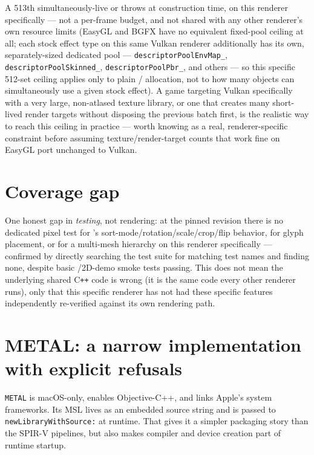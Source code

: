 A 513th simultaneously-live  or  throws at
construction time, on this renderer specifically --- not a per-frame budget, and not shared with
any other renderer's own resource limits (EasyGL and BGFX have no equivalent fixed-pool
ceiling at all; each stock effect type on this same Vulkan renderer additionally has its own,
separately-sized dedicated pool --- \texttt{descriptorPoolEnvMap\_},
\texttt{descriptorPoolSkinned\_}, \texttt{descriptorPoolPbr\_}, and others --- so this specific
512-set ceiling applies only to plain  / 
allocation, not to how many objects can simultaneously use a given stock effect). A game
targeting Vulkan specifically with a very large, non-atlased texture library, or one that
creates many short-lived render targets without disposing the previous batch first, is the
realistic way to reach this ceiling in practice --- worth knowing as a real, renderer-specific
constraint before assuming texture/render-target counts that work fine on EasyGL port
unchanged to Vulkan.

\section{Coverage gap}

One honest gap in \emph{testing}, not rendering: at the pinned revision there is no dedicated
pixel test for 's sort-mode/rotation/scale/crop/flip behavior, for
 glyph placement, or for a multi-mesh  hierarchy on this
renderer specifically --- confirmed by directly searching the test suite for matching test
names and finding none, despite basic /2D-demo smoke tests passing.
This does not mean the underlying shared C\texttt{++} code is wrong (it is the same code
every other renderer runs), only that this specific renderer has not had these specific
features independently re-verified against its own rendering path.

\section{METAL: a narrow implementation with explicit refusals}

\texttt{METAL} is macOS-only, enables Objective-C++, and links Apple's system frameworks.
Its MSL lives as an embedded source string and is passed to
\texttt{newLibraryWithSource:} at runtime.  That gives it a simpler packaging story than the
SPIR-V pipelines, but also makes compiler and device creation part of runtime startup.

